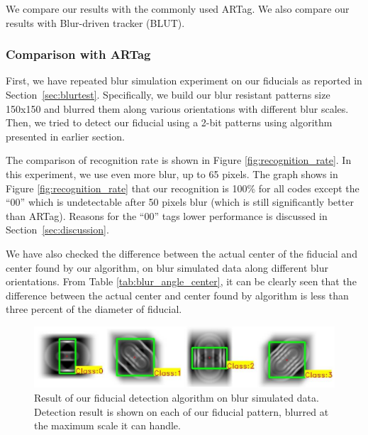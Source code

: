 \documentclass[runningheads]{llncs}
\begin{document}
We compare our results with the commonly used ARTag. We also compare 
our results with Blur-driven tracker (BLUT)\cite{Wu:2011}.
\subsubsection{Comparison with ARTag}
First, we have repeated blur simulation experiment on our fiducials as reported
in Section~\ref{sec:blurtest}.  Specifically, we build our blur resistant
patterns size 150x150 and blurred them along various orientations with different
blur scales. Then, we tried to detect our fiducial using a 2-bit patterns using
algorithm presented in earlier section. 

The comparison of recognition rate is shown in Figure
\ref{fig:recognition_rate}. In this experiment, we use even more blur, up to 65
pixels.  The graph shows in Figure \ref{fig:recognition_rate} that our
recognition is 100\% for all codes except the ``00'' which is undetectable
after 50 pixels blur (which is still significantly better than ARTag).  Reasons
for the ``00'' tags lower performance is discussed in Section~\ref{sec:discussion}.

We have also checked the difference between the actual center of the fiducial
and center found by our algorithm, on blur simulated data along different blur
orientations. From Table \ref{tab:blur_angle_center}, it can be clearly seen
that the difference between the actual center and center found by algorithm is
less than three percent of the diameter of fiducial. 

\begin{figure}
\includegraphics[width=\linewidth]{blur_maximum.pdf}
\caption{Result of our fiducial detection algorithm on blur simulated data.
Detection result is shown on each of our fiducial pattern, blurred at the
maximum scale it can handle.}
\label{fig:blur_maximum}
\end{figure}
\end{document}

